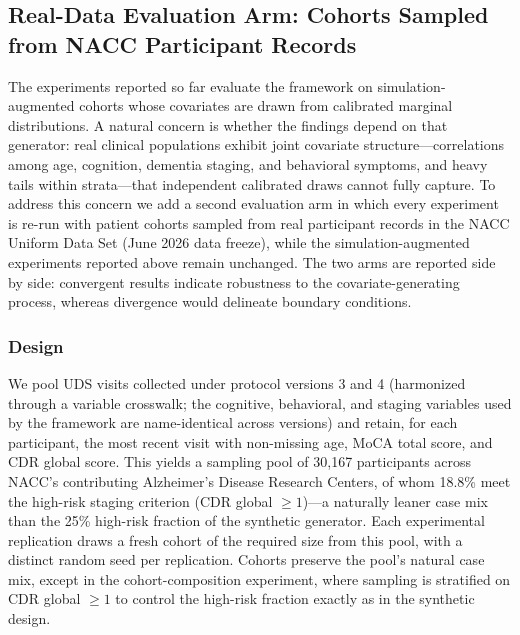 \documentclass[11pt,a4paper]{article}
\begin{document}
{\color{red}
\subsection{Real-Data Evaluation Arm: Cohorts Sampled from NACC Participant Records}
\label{sec:real_data_arm}

The experiments reported so far evaluate the framework on simulation-augmented cohorts whose covariates are drawn from calibrated marginal distributions. A natural concern is whether the findings depend on that generator: real clinical populations exhibit joint covariate structure---correlations among age, cognition, dementia staging, and behavioral symptoms, and heavy tails within strata---that independent calibrated draws cannot fully capture. To address this concern we add a second evaluation arm in which every experiment is re-run with patient cohorts sampled from real participant records in the NACC Uniform Data Set (June 2026 data freeze), while the simulation-augmented experiments reported above remain unchanged. The two arms are reported side by side: convergent results indicate robustness to the covariate-generating process, whereas divergence would delineate boundary conditions.

\subsubsection{Design}

We pool UDS visits collected under protocol versions 3 and 4 (harmonized through a variable crosswalk; the cognitive, behavioral, and staging variables used by the framework are name-identical across versions) and retain, for each participant, the most recent visit with non-missing age, MoCA total score, and CDR global score. This yields a sampling pool of 30{,}167 participants across NACC's contributing Alzheimer's Disease Research Centers, of whom 18.8\% meet the high-risk staging criterion (CDR global $\geq 1$)---a naturally leaner case mix than the 25\% high-risk fraction of the synthetic generator. Each experimental replication draws a fresh cohort of the required size from this pool, with a distinct random seed per replication. Cohorts preserve the pool's natural case mix, except in the cohort-composition experiment, where sampling is stratified on CDR global $\geq 1$ to control the high-risk fraction exactly as in the synthetic design.

}
\end{document}
